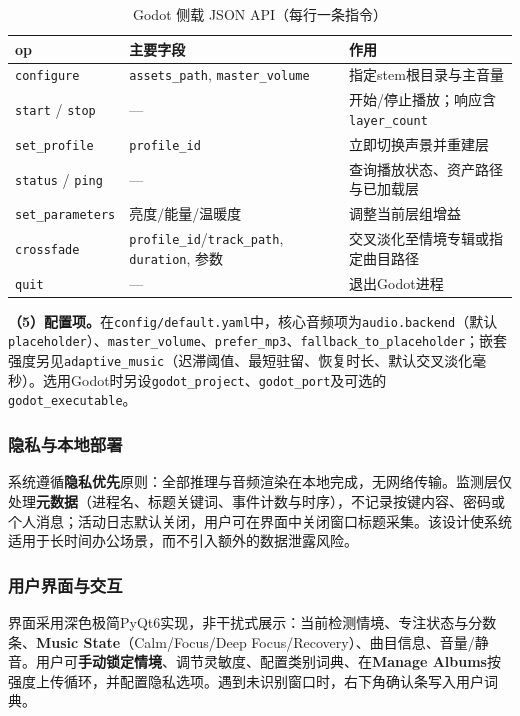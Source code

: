 \documentclass[12pt, fontset=windows]{ctexart}
\begin{document}
\begin{table}[H]
\centering
\caption{Godot 侧载 JSON API（每行一条指令）}
\label{tab:godot-api}
\begin{tabular}{@{}llp{7cm}@{}}
\toprule
\textbf{op} & \textbf{主要字段} & \textbf{作用} \\
\midrule
\texttt{configure} & \texttt{assets\_path}, \texttt{master\_volume} & 指定stem根目录与主音量 \\
\texttt{start} / \texttt{stop} & — & 开始/停止播放；响应含\texttt{layer\_count} \\
\texttt{set\_profile} & \texttt{profile\_id} & 立即切换声景并重建层 \\
\texttt{status} / \texttt{ping} & — & 查询播放状态、资产路径与已加载层 \\
\texttt{set\_parameters} & 亮度/能量/温暖度 & 调整当前层组增益 \\
\texttt{crossfade} & \texttt{profile\_id}/\texttt{track\_path}, \texttt{duration}, 参数 & 交叉淡化至情境专辑或指定曲目路径 \\
\texttt{quit} & — & 退出Godot进程 \\
\bottomrule
\end{tabular}
\end{table}

\textbf{（5）配置项。}在\texttt{config/default.yaml}中，核心音频项为\texttt{audio.backend}（默认\texttt{placeholder}）、\texttt{master\_volume}、\texttt{prefer\_mp3}、\texttt{fallback\_to\_placeholder}；嵌套强度另见\texttt{adaptive\_music}（迟滞阈值、最短驻留、恢复时长、默认交叉淡化毫秒）。选用Godot时另设\texttt{godot\_project}、\texttt{godot\_port}及可选的\texttt{godot\_executable}。

\subsubsection{隐私与本地部署}

系统遵循\textbf{隐私优先}原则：全部推理与音频渲染在本地完成，无网络传输。监测层仅处理\textbf{元数据}（进程名、标题关键词、事件计数与时序），不记录按键内容、密码或个人消息；活动日志默认关闭，用户可在界面中关闭窗口标题采集。该设计使系统适用于长时间办公场景，而不引入额外的数据泄露风险。

\subsubsection{用户界面与交互}

界面采用深色极简PyQt6实现，非干扰式展示：当前检测情境、专注状态与分数条、\textbf{Music State}（Calm/Focus/Deep Focus/Recovery）、曲目信息、音量/静音。用户可\textbf{手动锁定情境}、调节灵敏度、配置类别词典、在\textbf{Manage Albums}按强度上传循环，并配置隐私选项。遇到未识别窗口时，右下角确认条写入用户词典。
\end{document}
